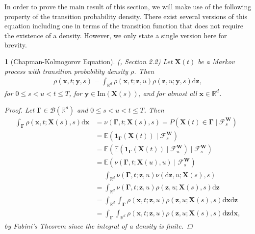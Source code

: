 \documentclass[english]{article}
\numberwithin{equation}{section}
\numberwithin{figure}{section}
\theoremstyle{bolddescit}
\newtheorem{theorem}{\protect\theoremname}[section]
\theoremstyle{definition}
\theoremstyle{definition}
\theoremstyle{plain}
\theoremstyle{plain}
\theoremstyle{bolddesc}
\theoremstyle{plain}
\theoremstyle{remark}
\providecommand{\theoremname}{Theorem}
\begin{document}
In order to prove the main result of this section, we will make use of the following property of the transition probability density. There exist several versions of this equation including one in terms of the transition function that does not require the existence of a density. However, we only state a single version here for brevity.

\begin{theorem}[Chapman-Kolmogorov Equation]\label{thm:fp-chapman-kolmogorov}
  (\cite{pavliotis_stochastic_2014}, Section 2.2)
  Let $\mathbf{X}(t)$ be a Markov process with transition probability density $\rho$. Then
  \begin{align*}
    \rho(\mathbf{x}, t; \mathbf{y}, s) = \int_{\mathbb{R}^d} \rho(\mathbf{x}, t; \mathbf{z}, u) \rho(\mathbf{z}, u; \mathbf{y}, s) \mathrm{d}\mathbf{z},
  \end{align*}
  for $0 \le s < u < t \le T$, for $\mathbf{y} \in \mathrm{Im}(\mathbf{X}(s))$, and for almost all $\mathbf{x} \in \mathbb{R}^d$.

  \begin{proof}
    Let $\mathbf{\Gamma} \in \mathcal{B}(\mathbb{R}^d)$ and $0 \le s < u < t \le T$. Then
    \begin{align*}
      \int_\mathbf{\Gamma} \rho(\mathbf{x},t;\mathbf{X}(s),s) \mathrm{d}\mathbf{x}
      &= \nu(\mathbf{\Gamma},t;\mathbf{X}(s),s)
      = P(\mathbf{X}(t) \in \mathbf{\Gamma} \mid \mathcal{F}^\mathbf{W}_s)\\
      &= \mathbb{E}(\mathbf{1}_\mathbf{\Gamma}(\mathbf{X}(t)) \mid \mathcal{F}^\mathbf{W}_s)\\
      &= \mathbb{E}(\mathbb{E}(\mathbf{1}_\mathbf{\Gamma}(\mathbf{X}(t)) \mid \mathcal{F}^\mathbf{W}_u) \mid \mathcal{F}^\mathbf{W}_s) \tag{tower property}\\
      &= \mathbb{E}(\nu(\mathbf{\Gamma},t;\mathbf{X}(u),u) \mid \mathcal{F}^\mathbf{W}_s)\\
      &= \int_{\mathbb{R}^d} \nu(\mathbf{\Gamma},t;\mathbf{z},u) \nu(\mathrm{d}\mathbf{z},u;\mathbf{X}(s),s)\\
      &= \int_{\mathbb{R}^d} \nu(\mathbf{\Gamma},t;\mathbf{z},u) \rho(\mathbf{z},u;\mathbf{X}(s),s) \mathrm{d}\mathbf{z}\\
      &= \int_{\mathbb{R}^d} \int_\mathbf{\Gamma} \rho(\mathbf{x},t;\mathbf{z},u) \rho(\mathbf{z},u;\mathbf{X}(s),s) \mathrm{d}\mathbf{x} \mathrm{d}\mathbf{z}\\
      &= \int_\mathbf{\Gamma} \int_{\mathbb{R}^d} \rho(\mathbf{x},t;\mathbf{z},u) \rho(\mathbf{z},u;\mathbf{X}(s),s) \mathrm{d}\mathbf{z} \mathrm{d}\mathbf{x},
    \end{align*}
    by Fubini's Theorem since the integral of a density is finite.


\end{proof}
\end{theorem}
\end{document}

